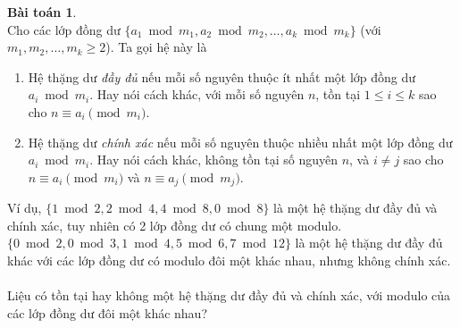 \documentclass{article}
\theoremstyle{definition}
\newtheorem{exercise}[theorem]{Bài toán}
\begin{document}
\begin{exercise} \ \\
Cho các lớp đồng dư $\{ a_1 \bmod{m_1}, a_2 \bmod{m_2}, \hdots, a_k \bmod{m_k} \}$ (với $m_1, m_2, \hdots, m_k \geq 2$). Ta gọi hệ này là
\begin{enumerate}
	\item Hệ thặng dư \emph{đầy đủ} nếu mỗi số nguyên thuộc ít nhất một lớp đồng dư $a_i \bmod{m_i}$. Hay nói cách khác, với mỗi số nguyên $n$, tồn tại $1 \leq i \leq k$ sao cho $n \equiv a_i \pmod{m_i}$.
	\item Hệ thặng dư \emph{chính xác} nếu mỗi số nguyên thuộc nhiều nhất một lớp đồng dư $a_i \bmod{m_i}$. Hay nói cách khác, không tồn tại số nguyên $n$, và $i \neq j$ sao cho $n \equiv a_i \pmod{m_i}$ và $n \equiv a_j \pmod{m_j}$.
\end{enumerate}
Ví dụ, $\{ 1 \bmod{2}, 2 \bmod{4}, 4 \bmod{8}, 0 \bmod{8} \}$ là một hệ thặng dư đầy đủ và chính xác, tuy nhiên có 2 lớp đồng dư có chung một modulo.  $\{ 0 \bmod{2}, 0 \bmod{3}, 1 \bmod{4}, 5 \bmod{6}, 7 \bmod{12} \}$ là một hệ thặng dư đầy đủ khác với các lớp đồng dư có modulo đôi một khác nhau, nhưng không chính xác.
\\
\\
Liệu có tồn tại hay không một hệ thặng dư đầy đủ và chính xác, với modulo của các lớp đồng dư đôi một khác nhau?
\end{exercise}

\newpage
\end{document}
